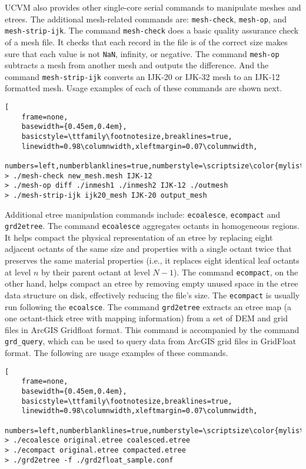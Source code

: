 UCVM also provides other single-core serial commands to manipulate meshes and etrees. The additional mesh-related commands are: \texttt{mesh-check}, \texttt{mesh-op}, and \texttt{mesh-strip-ijk}. The command \texttt{mesh-check} does a basic quality assurance check of a mesh file. It checks that each record in the file is of the correct size makes sure that each value is not \texttt{NaN}, infinity, or negative. The command \texttt{mesh-op} subtracts a mesh from another mesh and outputs the difference. And the command \texttt{mesh-strip-ijk} converts an IJK-20 or IJK-32 mesh to an IJK-12 formatted mesh. Usage examples of each of these commands are shown next.

\begin{lstlisting}[
	frame=none,
	basewidth={0.45em,0.4em},
	basicstyle=\ttfamily\footnotesize,breaklines=true,
	linewidth=0.98\columnwidth,xleftmargin=0.07\columnwidth,
	numbers=left,numberblanklines=true,numberstyle=\scriptsize\color{mylistingnclr}]
> ./mesh-check new_mesh.mesh IJK-12
> ./mesh-op diff ./inmesh1 ./inmesh2 IJK-12 ./outmesh
> ./mesh-strip-ijk ijk20_mesh IJK-20 output_mesh
\end{lstlisting}

Additional etree manipulation commands include: \texttt{ecoalesce}, \texttt{ecompact} and \texttt{grd2etree}. The command \texttt{ecoalesce} aggregates octants in homogeneous regions. It helps compact the physical representation of an etree by replacing eight adjacent octants of the same size and properties with a single octant twice that preserves the same material properties (i.e., it replaces eight identical leaf octants at level $n$ by their parent octant at level $N-1$). The command \texttt{ecompact}, on the other hand, helps compact an etree by removing empty unused space in the etree data structure on disk, effectively reducing the file's size. The \texttt{ecompact} is usually run following the \texttt{ecoalsce}. The command \texttt{grd2etree} extracts an etree map (a one octant-thick etree with mapping information) from a set of DEM and \vsthirty{} grid files in ArcGIS Gridfloat format. This command is accompanied by the command \texttt{grd\_query}, which can be used to query data from ArcGIS grid files in GridFloat format. The following are usage examples of these commands.

\begin{lstlisting}[
	frame=none,
	basewidth={0.45em,0.4em},
	basicstyle=\ttfamily\footnotesize,breaklines=true,
	linewidth=0.98\columnwidth,xleftmargin=0.07\columnwidth,
	numbers=left,numberblanklines=true,numberstyle=\scriptsize\color{mylistingnclr}]
> ./ecoalesce original.etree coalesced.etree
> ./ecompact original.etree compacted.etree
> ./grd2etree -f ./grd2float_sample.conf
\end{lstlisting}

